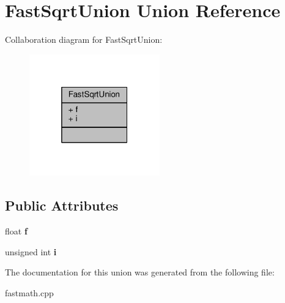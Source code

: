 \hypertarget{unionFastSqrtUnion}{}\section{Fast\+Sqrt\+Union Union Reference}
\label{unionFastSqrtUnion}


Collaboration diagram for Fast\+Sqrt\+Union\+:
\nopagebreak
\begin{figure}[H]
\begin{center}
\leavevmode
\includegraphics[width=160pt]{d8/db9/unionFastSqrtUnion__coll__graph}
\end{center}
\end{figure}
\subsection*{Public Attributes}
\begin{DoxyCompactItemize}
\item 
float {\bfseries f}\hypertarget{unionFastSqrtUnion_ae2aafc4b0414d915e8f5a3a33b0fc1cc}{}\label{unionFastSqrtUnion_ae2aafc4b0414d915e8f5a3a33b0fc1cc}

\item 
unsigned int {\bfseries i}\hypertarget{unionFastSqrtUnion_ade6f306feacf4d539b9fbcbb76f9c356}{}\label{unionFastSqrtUnion_ade6f306feacf4d539b9fbcbb76f9c356}

\end{DoxyCompactItemize}


The documentation for this union was generated from the following file\+:\begin{DoxyCompactItemize}
\item 
fastmath.\+cpp\end{DoxyCompactItemize}
